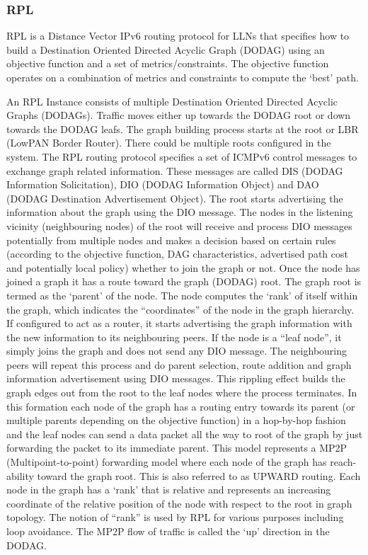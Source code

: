 \subsubsection{RPL}
RPL is a Distance Vector IPv6 routing protocol for LLNs that specifies how to build a Destination Oriented Directed Acyclic Graph (DODAG) using an objective function and a set of metrics/constraints.
The objective function operates on a combination of metrics and constraints to compute the ‘best’ path.

An RPL Instance consists of multiple Destination Oriented Directed Acyclic Graphs (DODAGs).
Traffic moves either up towards the DODAG root or down towards the DODAG leafs.
The graph building process starts at the root or LBR (LowPAN Border Router).
There could be multiple roots configured in the system.
The RPL routing protocol specifies a set of ICMPv6 control messages to exchange graph related information.
These messages are called DIS (DODAG Information Solicitation),
	DIO (DODAG Information Object) and DAO (DODAG Destination Advertisement Object).
The root starts advertising the information about the graph using the DIO message.
The nodes in the listening vicinity (neighbouring nodes) of the root will receive and process DIO messages potentially from multiple nodes and makes a decision based on certain rules (according to the objective function,
	DAG characteristics,
	advertised path cost and potentially local policy) whether to join the graph or not.
Once the node has joined a graph it has a route toward the graph (DODAG) root.
The graph root is termed as the ‘parent’ of the node.
The node computes the ‘rank’ of itself within the graph,
	which indicates the “coordinates” of the node in the graph hierarchy.
If configured to act as a router,
	it starts advertising the graph information with the new information to its neighbouring peers.
If the node is a “leaf node”,
	it simply joins the graph and does not send any DIO message.
The neighbouring peers will repeat this process and do parent selection,
	route addition and graph information advertisement using DIO messages.
This rippling effect builds the graph edges out from the root to the leaf nodes where the process terminates.
In this formation each node of the graph has a routing entry towards its parent (or multiple parents depending on the objective function) in a hop-by-hop fashion and the leaf nodes can send a data packet all the way to root of the graph by just forwarding the packet to its immediate parent.
This model represents a MP2P (Multipoint-to-point) forwarding model where each node of the graph has reach-ability toward the graph root.
This is also referred to as UPWARD routing.
Each node in the graph has a ‘rank’ that is relative and represents an increasing coordinate of the relative position of the node with respect to the root in graph topology.
The notion of “rank” is used by RPL for various purposes including loop avoidance.
The MP2P flow of traffic is called the ‘up’ direction in the DODAG.


